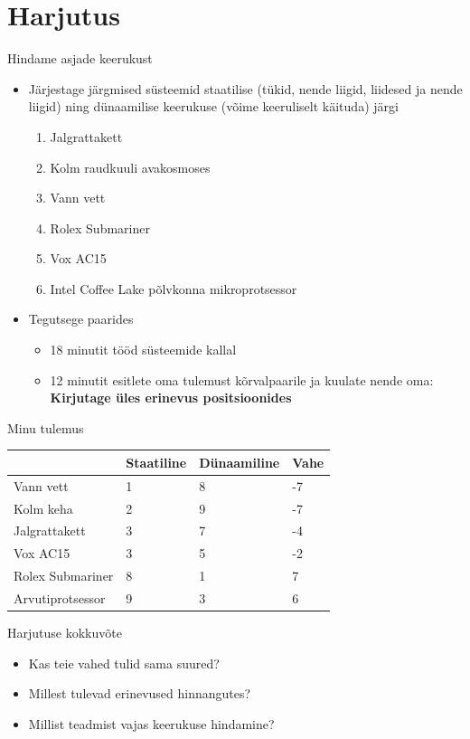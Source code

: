 \documentclass{beamer}
\begin{document}
\section{Harjutus}
\begin{frame}{Hindame asjade keerukust}

	\begin{itemize}
		\item Järjestage järgmised süsteemid staatilise (tükid, nende liigid, liidesed ja nende liigid) ning dünaamilise keerukuse (võime keeruliselt käituda) järgi
		\begin{enumerate}
			\item Jalgrattakett
			\item Kolm raudkuuli avakosmoses
			\item Vann vett
			\item Rolex Submariner
			\item Vox AC15
			\item Intel Coffee Lake põlvkonna mikroprotsessor
		\end{enumerate}
		\item Tegutsege paarides
		\begin{itemize}
			\item 18 minutit tööd süsteemide kallal
			\item 12 minutit esitlete oma tulemust kõrvalpaarile ja kuulate nende oma: \textbf{Kirjutage üles erinevus positsioonides}
		\end{itemize}
	\end{itemize}
\end{frame}

\begin{frame}{Minu tulemus}
\begin{table}[]
\centering
\begin{tabular}{l|l|l|l}
 & \textbf{Staatiline} & \textbf{Dünaamiline} & \textbf{Vahe} \\ \hline
Vann  vett & 1 & 8 & -7 \\
Kolm keha & 2 & 9 & -7 \\
Jalgrattakett & 3 & 7 & -4 \\
Vox AC15 & 3 & 5 & -2 \\
Rolex Submariner & 8 & 1 & 7 \\
Arvutiprotsessor & 9 & 3 & 6
\end{tabular}
\end{table}
\end{frame}

\begin{frame}{Harjutuse kokkuvõte}
	\begin{itemize}
		\item Kas teie vahed tulid sama suured?
		\item Millest tulevad erinevused hinnangutes?
		\item Millist teadmist vajas keerukuse hindamine?
	\end{itemize}
\end{frame}
\end{document}
